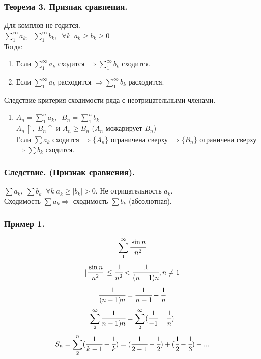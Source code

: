 \documentclass[12pt, paper]{article}
\begin{document}
\subsubsection{Теорема 3. Признак сравнения.}
Для комплов не годится.\\
$\sum^{\infty}_{1} a_k,\;\; \sum^{\infty}_{1} b_k,\;\; \forall k\;\; a_k \geq \underline{b_k \geq 0}$\\
Тогда:
\begin{enumerate}
    \item Если $\sum^{\infty}_{1} a_k$ сходится $\Rightarrow \sum^{\infty}_{1} b_k$ сходится.
    \item Если $\sum^{\infty}_{1} a_k$ расходится $\Rightarrow \sum^{\infty}_{1} b_k$ расходится.
\end{enumerate}
\begin{tcolorbox}[title=Доказательство]
Следствие критерия сходимости ряда с неотрицательными членами.\\
\begin{enumerate}
    \item $A_n = \sum^{n}_{1} a_k,\;\; B_n = \sum^{n}_{1} b_k $\\
    $A_n \uparrow,\; B_n \uparrow$ и $A_n \geq B_n$ ($A_n$ можарирует $B_n$)\\
    Если $\sum a_k$ сходится $\Rightarrow \{A_n\}$ ограничена сверху $\Rightarrow \{B_n\}$ ограничена сверху $\Rightarrow \sum b_k$ сходится.
\end{enumerate}
\end{tcolorbox}

\subsubsection{Следствие. (Признак сравнения).}
$\sum a_k,\; \sum b_k \;\; \forall k\; a_k \geq |b_k| > 0$. Не отрицательность $a_k$.\\
Сходимость $\sum a_k \Rightarrow$ сходимость $\sum b_k$ (абсолютная).
\subsubsection*{Пример 1.}
\[\sum^{\infty}_{1} \cfrac{\sin n}{n^2}\]
\[|\cfrac{\sin n}{n^2}| \leq \cfrac{1}{n^2} < \cfrac{1}{(n-1)n}, n \not= 1\]
\[ \cfrac{1}{(n-1)n} = \cfrac{1}{n-1} - \cfrac{1}{n} \]
\[ \sum^{\infty}_{2} \cfrac{1}{n-1)n} = \sum^{\infty}_{2}( \cfrac{1}{-1} - \cfrac{1}{n}) \]
\[ S_n = \sum^{n}_{2} (\cfrac{1}{k-1} - \cfrac{1}{k}) = (\cfrac{1}{2-1} - \cfrac{1}{2}) + (\cfrac{1}{2} - \cfrac{1}{3}) + ... \]
\end{document}
